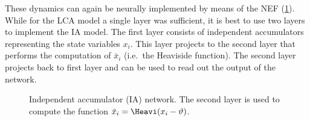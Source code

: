 These dynamics can again be neurally implemented by means of the NEF (\cref{fig:ia}).
While for the LCA model a single layer was sufficient, it is best to use two layers to implement the IA model.
The first layer consists of independent accumulators representing the state variables $x_i$.
This layer projects to the second layer that performs the computation of $\bar{x}_i$ (i.e.\ the Heaviside function).
The second layer projects back to first layer and can be used to read out the output of the network.
\begin{figure}
    \begin{captionbeside}{Independent accumulator (IA) network. The second layer is used to compute the function $\bar{x}_i = \Heavi(x_i - \vartheta)$.\label{fig:ia}}
    \end{captionbeside}
\end{figure}

